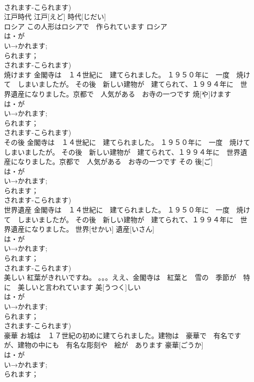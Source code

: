 \documentclass[8pt]{extreport}
\begin{document}
\begin{CJK}{UTF8}{min}
\\	されます-こられます)
\\	江戸時代		江戸[えど] 時代[じだい]			
\\	ロシア	この人形はロシアで　作られています	ロシア				
\\	は・が
\\	い→かれます;
\\	られます；
\\	されます-こられます)
\\	焼けます	金閣寺は　１４世紀に　建てられました。 １９５０年に　一度　焼けて　しまいましたが。 その後　新しい建物が　建てられて、１９９４年に　世界遺産になりました。京都で　人気がある　お寺の一つです	焼[や]けます				
\\	は・が
\\	い→かれます;
\\	られます；
\\	されます-こられます)
\\	その後	金閣寺は　１４世紀に　建てられました。 １９５０年に　一度　焼けて　しまいましたが。 その後　新しい建物が　建てられて、１９９４年に　世界遺産になりました。京都で　人気がある　お寺の一つです	その 後[ご]				
\\	は・が
\\	い→かれます;
\\	られます；
\\	されます-こられます)
\\	世界遺産	金閣寺は　１４世紀に　建てられました。 １９５０年に　一度　焼けて　しまいましたが。 その後　新しい建物が　建てられて、１９９４年に　世界遺産になりました。	世界[せかい] 遺産[いさん]				
\\	は・が
\\	い→かれます;
\\	られます；
\\	されます-こられます)
\\	美しい	紅葉がきれいですね。 。。。ええ、金閣寺は　紅葉と　雪の　季節が　特に　美しいと言われています	美[うつく]しい			
\\	は・が
\\	い→かれます;
\\	られます；
\\	されます-こられます)
\\	豪華	お城は　１７世紀の初めに建てられました。建物は　豪華で　有名ですが、建物の中にも　有名な彫刻や　絵が　あります	豪華[ごうか]			
\\	は・が
\\	い→かれます;
\\	られます；

\end{CJK}
\end{document}
